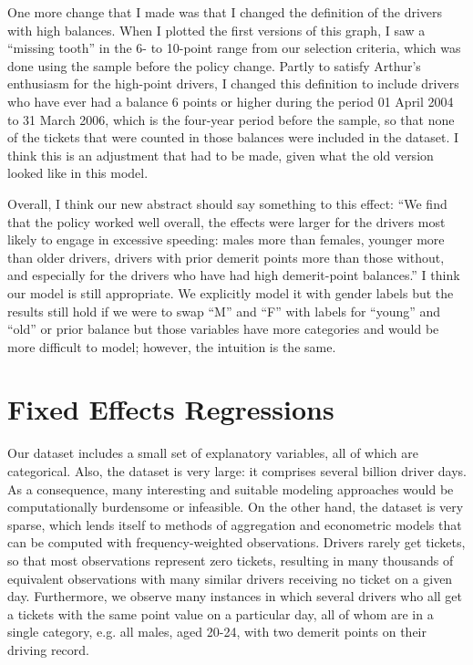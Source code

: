 \documentclass[12pt]{paper}
\begin{document}
One more change that I made was that I changed the definition of the drivers with high balances. 
When I plotted the first versions of this graph, I saw a ``missing tooth'' in the 6- to 10-point range from our selection criteria, which was done using the sample before the policy change. 
Partly to satisfy Arthur's enthusiasm for the high-point drivers, I changed this definition to include drivers who have ever had a balance 6 points or higher during the period 01 April 2004 to 31 March 2006, which is the four-year period before the sample,  so that none of the tickets that were counted in those balances were included in the dataset. 
I think this is an adjustment that had to be made, given what the old version looked like in this model. 

Overall, I think our new abstract should say something to this effect: 
``We find that the policy worked well overall, the effects were larger for the drivers most likely to engage in excessive speeding: males more than females, younger more than older drivers, drivers with prior demerit points more than those without, and especially for the drivers who have had high demerit-point balances.'' 
I think our model is still appropriate. We explicitly model it with gender labels but the results still hold if we were to swap ``M'' and ``F'' with labels for ``young'' and ``old'' or prior balance
but those variables have more categories and would be more difficult to model; however, the intuition is the same. 


\section*{Fixed Effects Regressions}

Our dataset includes a small set of explanatory variables, all of which are categorical. 
Also, the dataset is very large: it comprises several billion driver days. 
As a consequence, many interesting and suitable modeling approaches would be computationally burdensome or infeasible. 
On the other hand, the dataset is very sparse, which lends itself to methods of aggregation and
econometric models that can be computed with frequency-weighted observations.
Drivers rarely get tickets, so that most observations represent zero tickets, 
resulting in many thousands of equivalent observations with many similar drivers 
receiving no ticket on a given day. 
Furthermore, we observe many instances in which several drivers
who all get a tickets with the same point value on a particular day, 
all of whom are in a single category, 
e.g. all males, aged 20-24, with two demerit points on their driving record. 
\end{document}

